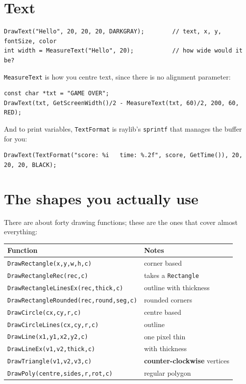 \section{Text}

\begin{lstlisting}
DrawText("Hello", 20, 20, 20, DARKGRAY);        // text, x, y, fontSize, color
int width = MeasureText("Hello", 20);           // how wide would it be?
\end{lstlisting}

\lstinline|MeasureText| is how you centre text, since there is no alignment
parameter:

\begin{lstlisting}
const char *txt = "GAME OVER";
DrawText(txt, GetScreenWidth()/2 - MeasureText(txt, 60)/2, 200, 60, RED);
\end{lstlisting}

And to print variables, \lstinline|TextFormat| is raylib's
\lstinline|sprintf| that manages the buffer for you:

\begin{lstlisting}
DrawText(TextFormat("score: %i   time: %.2f", score, GetTime()), 20, 20, 20, BLACK);
\end{lstlisting}


\section{The shapes you actually use}

There are about forty drawing functions; these are the ones that cover almost
everything:

\begin{center}
\begin{tabular}{@{}ll@{}}
\toprule
\textbf{Function} & \textbf{Notes} \\
\midrule
\lstinline|DrawRectangle(x,y,w,h,c)| & corner based \\
\lstinline|DrawRectangleRec(rec,c)| & takes a \lstinline|Rectangle| \\
\lstinline|DrawRectangleLinesEx(rec,thick,c)| & outline with thickness \\
\lstinline|DrawRectangleRounded(rec,round,seg,c)| & rounded corners \\
\lstinline|DrawCircle(cx,cy,r,c)| & centre based \\
\lstinline|DrawCircleLines(cx,cy,r,c)| & outline \\
\lstinline|DrawLine(x1,y1,x2,y2,c)| & one pixel thin \\
\lstinline|DrawLineEx(v1,v2,thick,c)| & with thickness \\
\lstinline|DrawTriangle(v1,v2,v3,c)| & \textbf{counter-clockwise} vertices \\
\lstinline|DrawPoly(centre,sides,r,rot,c)| & regular polygon \\
\bottomrule
\end{tabular}
\end{center}

